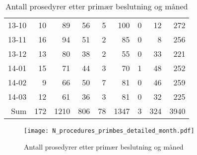 \documentclass[presentation,xcolor=pdftex,dvipsnames,table]{beamer}
\begin{document}
\begin{frame}
\begin{tiny}
\begin{table}[ht]
\begin{tabular}{rrrrrrrrr}
  13-10 & 10 & 89 & 56 & 5 & 100 & 0 & 12 & 272 \\ 
  13-11 & 16 & 94 & 51 & 2 & 85 & 0 & 8 & 256 \\ 
  13-12 & 13 & 80 & 38 & 2 & 55 & 0 & 33 & 221 \\ 
  14-01 & 15 & 71 & 44 & 3 & 70 & 1 & 48 & 252 \\ 
  14-02 & 9 & 66 & 50 & 7 & 81 & 0 & 46 & 259 \\ 
  14-03 & 12 & 61 & 36 & 3 & 81 & 0 & 32 & 225 \\ 
  Sum & 172 & 1210 & 806 & 78 & 1347 & 3 & 324 & 3940 \\ 
   \bottomrule
\end{tabular}
\caption{Antall prosedyrer etter primær beslutning og måned} 
\end{table}\end{tiny}
\end{frame}




\begin{frame}
\begin{figure}
  \centering
  \caption{Antall prosedyrer etter primær beslutning og måned}
\texttt{[image: N\_procedures\_primbes\_detailed\_month.pdf]}
\end{figure}\end{frame}
\end{document}
